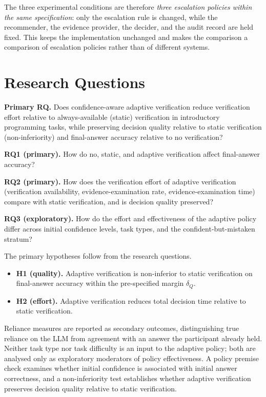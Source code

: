 \documentclass[oneside,final,14pt,a4paper]{extreport}
\begin{document}
The three experimental conditions are therefore \emph{three escalation
policies within the same specification}: only the escalation rule is changed,
while the recommender, the evidence provider, the decider, and the audit record
are held fixed. This keeps the implementation unchanged and makes
the comparison a comparison of escalation policies rather than of different
systems.

\section{Research Questions}
\label{sec:rq}

\textbf{Primary RQ.} Does confidence-aware adaptive verification reduce
verification effort relative to always-available (static) verification in
introductory programming tasks, while preserving decision quality relative to
static verification (non-inferiority) and final-answer accuracy relative to no
verification?

\textbf{RQ1 (primary).} How do no, static, and adaptive verification affect
final-answer accuracy?

\textbf{RQ2 (primary).} How does the verification effort of adaptive
verification (verification availability, evidence-examination rate,
evidence-examination time) compare with static verification, and is decision
quality preserved?

\textbf{RQ3 (exploratory).} How do the effort and effectiveness of the adaptive
policy differ across initial confidence levels, task types, and the
confident-but-mistaken stratum?

The primary hypotheses follow from the research questions.

\begin{itemize}
\item \textbf{H1 (quality).} Adaptive verification is non-inferior to static
verification on final-answer accuracy within the pre-specified margin
$\delta_Q$.
\item \textbf{H2 (effort).} Adaptive verification reduces total decision time
relative to static verification.
\end{itemize}

Reliance measures are reported as secondary outcomes, distinguishing true
reliance on the LLM from agreement with an answer the participant already held.
Neither task type nor task difficulty is an input to the adaptive policy; both
are analysed only as exploratory moderators of policy effectiveness. A policy
premise check examines whether initial confidence is associated with initial
answer correctness, and a non-inferiority test establishes whether adaptive
verification preserves decision quality relative to static verification.
\end{document}
